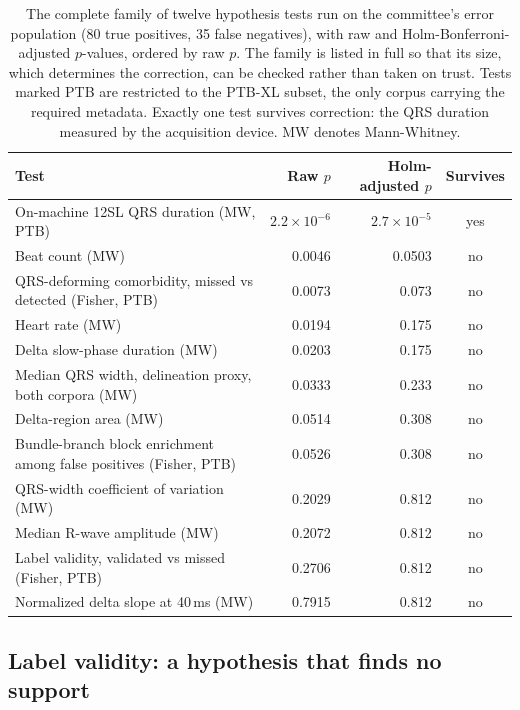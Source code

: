 \documentclass[11pt]{article}
\begin{document}
\begin{table}[t]
  \centering
  \small
  \caption{The complete family of twelve hypothesis tests run on the committee's error population (80 true positives, 35 false negatives), with raw and Holm-Bonferroni-adjusted $p$-values, ordered by raw $p$. The family is listed in full so that its size, which determines the correction, can be checked rather than taken on trust. Tests marked PTB are restricted to the PTB-XL subset, the only corpus carrying the required metadata. Exactly one test survives correction: the QRS duration measured by the acquisition device. MW denotes Mann-Whitney.}
  \label{tab:holm}
  \begin{tabular}{@{}lrrc@{}}
    \toprule
    Test & Raw $p$ & Holm-adjusted $p$ & Survives \\
    \midrule
    On-machine 12SL QRS duration (MW, PTB) & $2.2\times10^{-6}$ & $2.7\times10^{-5}$ & yes \\
    Beat count (MW) & 0.0046 & 0.0503 & no \\
    QRS-deforming comorbidity, missed vs detected (Fisher, PTB) & 0.0073 & 0.073 & no \\
    Heart rate (MW) & 0.0194 & 0.175 & no \\
    Delta slow-phase duration (MW) & 0.0203 & 0.175 & no \\
    Median QRS width, delineation proxy, both corpora (MW) & 0.0333 & 0.233 & no \\
    Delta-region area (MW) & 0.0514 & 0.308 & no \\
    Bundle-branch block enrichment among false positives (Fisher, PTB) & 0.0526 & 0.308 & no \\
    QRS-width coefficient of variation (MW) & 0.2029 & 0.812 & no \\
    Median R-wave amplitude (MW) & 0.2072 & 0.812 & no \\
    Label validity, validated vs missed (Fisher, PTB) & 0.2706 & 0.812 & no \\
    Normalized delta slope at 40\,ms (MW) & 0.7915 & 0.812 & no \\
    \bottomrule
  \end{tabular}
\end{table}

\subsection{Label validity: a hypothesis that finds no support}
\label{sec:labelval}
\end{document}
